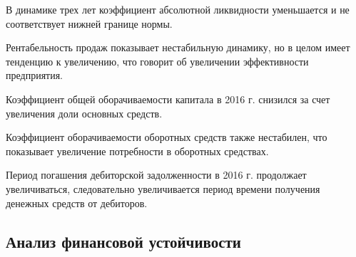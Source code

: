 В динамике трех лет коэффициент абсолютной ликвидности уменьшается и не соответствует нижней границе нормы.

Рентабельность продаж показывает нестабильную динамику, но в целом имеет тенденцию к увеличению, что говорит об увеличении эффективности предприятия.

Коэффициент общей оборачиваемости капитала в 2016 г. снизился за счет увеличения доли основных средств.

Коэффициент оборачиваемости оборотных средств также нестабилен, что показывает увеличение потребности в оборотных средствах.

Период погашения дебиторской задолженности в 2016 г. продолжает увеличиваться, следовательно увеличивается период времени получения денежных средств от дебиторов.










\subsection{Анализ финансовой устойчивости}

